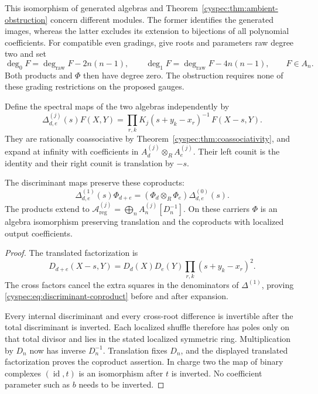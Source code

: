 This isomorphism of generated algebras and
Theorem~\ref{cyspec:thm:ambient-obstruction} concern different modules.
The former identifies the generated images, whereas the latter
excludes its extension to bijections of all polynomial coefficients.
For compatible even gradings, give roots and parameters raw degree
two and set
\[
 \deg_0F=\deg_{\mathrm{raw}}F-2n(n-1),\qquad
 \deg_1F=\deg_{\mathrm{raw}}F-4n(n-1),\qquad F\in A_n.
\]
Both products and $\Phi$ then have degree zero. The obstruction
requires none of these grading restrictions on the proposed gauges.

Define the spectral maps of the two algebras independently by
\begin{equation}\label{cyspec:eq:lattice-coproduct}
 \Delta^{(j)}_{d,e}(s)F(X,Y)=
 \prod_{r,k}K_j(s+y_k-x_r)^{-1}\,F(X-s,Y).
\end{equation}
They are rationally coassociative by
Theorem~\ref{cyspec:thm:coassociativity}, and expand at infinity with
coefficients in $A_d^{(j)}\otimes_R A_e^{(j)}$.
Their left counit is the identity and their right counit is
translation by $-s$.

\begin{proposition}\label{cyspec:prop:localized-comparison}
The discriminant maps preserve these coproducts:
\begin{equation}\label{cyspec:eq:discriminant-coproduct}
 \Delta^{(1)}_{d,e}(s)\Phi_{d+e}
 =(\Phi_d\otimes_R\Phi_e)\Delta^{(0)}_{d,e}(s).
\end{equation}
The products extend to
$\mathcal A^{(j)}_{\mathrm{reg}}=\bigoplus_n A_n^{(j)}[D_n^{-1}]$.
On these carriers $\Phi$ is an algebra isomorphism preserving
translation and the coproducts with localized output coefficients.
\end{proposition}

\begin{proof}
The translated factorization is
\[
 D_{d+e}(X-s,Y)=D_d(X)D_e(Y)
                         \prod_{r,k}(s+y_k-x_r)^2.
\]
The cross factors cancel the extra squares in the denominators of
$\Delta^{(1)}$, proving \eqref{cyspec:eq:discriminant-coproduct}
before and after expansion.

Every internal discriminant and every cross-root difference is
invertible after the total discriminant is inverted. Each localized
shuffle therefore has poles only on that total divisor and lies in
the stated localized symmetric ring. Multiplication by $D_n$ now
has inverse $D_n^{-1}$. Translation fixes $D_n$, and the displayed
translated factorization proves the coproduct assertion.
In charge two the map of binary complexes $(\operatorname{id},t)$
is an isomorphism after $t$ is inverted. No coefficient parameter
such as $b$ needs to be inverted.
\end{proof}

